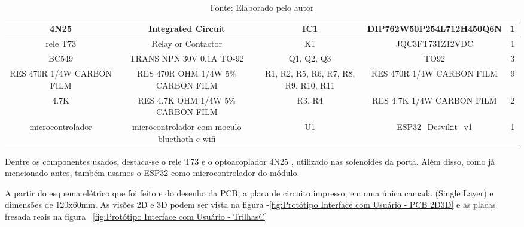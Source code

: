\documentclass[../delivery_hospital_report.tex]{subfiles}
\begin{document}
\begin{table}[!ht]
\begin{adjustbox}{width=\columnwidth,center}
\begin{tabular}{|c|c|c|c|c|}
4N25                        & Integrated Circuit                             & IC1                                    & DIP762W50P254L712H450Q6N    & 1        \\ \hline
rele T73                    & Relay or Contactor                             & K1                                     & JQC3FT731Z12VDC             & 1        \\ \hline
BC549                       & TRANS NPN 30V 0.1A   TO-92                     & Q1, Q2, Q3                             & TO92                        & 3        \\ \hline
RES 470R 1/4W   CARBON FILM & RES 470R OHM 1/4W 5\%   CARBON FILM            & R1, R2, R5, R6, R7,   R8, R9, R10, R11 & RES 470R 1/4W CARBON   FILM & 9        \\ \hline
4.7K                        & RES 4.7K OHM 1/4W 5\%   CARBON FILM            & R3, R4                                 & RES 4.7K 1/4W CARBON   FILM & 2        \\ \hline
microcontrolador            & microcontrolador com   moculo bluethoth e wifi & U1                                     & ESP32\_Desvikit\_v1         & 1        \\ \hline

\end{tabular}
\end{adjustbox}
\centering
\caption*{Fonte: Elaborado pelo autor}
\label{table:Componentes Utilizados na placa de Interface com Usuário - Protótipo}
\end{table}

Dentre os componentes usados, destaca-se o rele T73 \cite{rele_T73_datasheet} e o optoacoplador 4N25 \cite{4N25_datasheet} , utilizado nas solenoides da porta. Além disso, como já mencionado antes, também usamos o ESP32 \cite{esp32} como microcontrolador do módulo.

A partir do esquema elétrico que foi feito e do desenho da PCB, a placa de circuito impresso, em uma única camada (Single Layer) e dimensões de 120x60mm. As visões 2D e 3D podem ser vista na figura -\ref{fig:Protótipo Interface com Usuário - PCB 2D3D} e as placas fresada reais na figura ~\ref{fig:Protótipo Interface com Usuário - TrilhasC}
\end{document}
